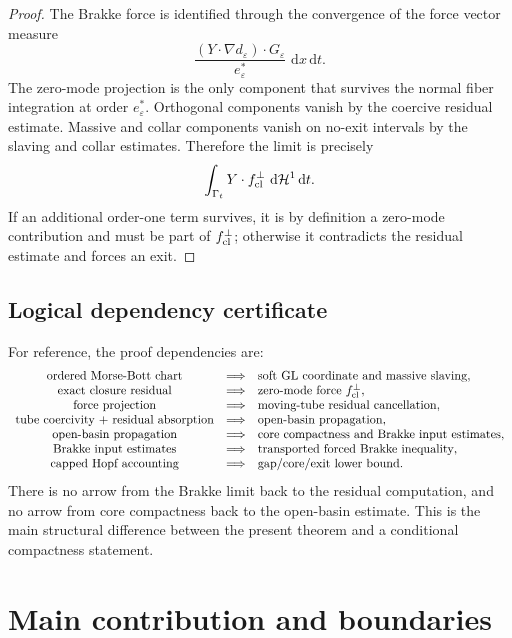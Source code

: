 \documentclass[11pt]{article}
\theoremstyle{definition}
\newcommand{\dd}{\,\mathrm d}
\newcommand{\eps}{\varepsilon}
\newcommand{\estar}{e_\varepsilon^\ast}
\newcommand{\Hh}{\mathcal H}
\begin{document}
\begin{proof}
The Brakke force is identified through the convergence of the force vector
measure
\[
        \frac{(Y\cdot\nabla d_\eps)\cdot G_\eps}{\estar}\,\dd x\dd t .
\]
The zero-mode projection is the only component that survives the normal
fiber integration at order \(\estar\).  Orthogonal components vanish by the
coercive residual estimate.  Massive and collar components vanish on no-exit
intervals by the slaving and collar estimates.  Therefore the limit is precisely
\[
        \int_{\Gamma_t}Y\cdot f_{\rm cl}^\perp\,\dd\Hh^1\dd t .
\]
If an additional order-one term survives, it is by definition a zero-mode
contribution and must be part of \(f_{\rm cl}^\perp\); otherwise it contradicts
the residual estimate and forces an exit.
\end{proof}

\subsection{Logical dependency certificate}

For reference, the proof dependencies are:
\[
\begin{array}{ccl}
\hbox{ordered Morse-Bott chart}
&\Longrightarrow&
\hbox{soft GL coordinate and massive slaving},\\
\hbox{exact closure residual}
&\Longrightarrow&
\hbox{zero-mode force }f_{\rm cl}^\perp,\\
\hbox{force projection}
&\Longrightarrow&
\hbox{moving-tube residual cancellation},\\
\hbox{tube coercivity + residual absorption}
&\Longrightarrow&
\hbox{open-basin propagation},\\
\hbox{open-basin propagation}
&\Longrightarrow&
\hbox{core compactness and Brakke input estimates},\\
\hbox{Brakke input estimates}
&\Longrightarrow&
\hbox{transported forced Brakke inequality},\\
\hbox{capped Hopf accounting}
&\Longrightarrow&
\hbox{gap/core/exit lower bound}.
\end{array}
\]
There is no arrow from the Brakke limit back to the residual computation, and
no arrow from core compactness back to the open-basin estimate.  This is the
main structural difference between the present theorem and a conditional
compactness statement.

\section{Main contribution and boundaries}
\label{sec:novelty}
\end{document}
